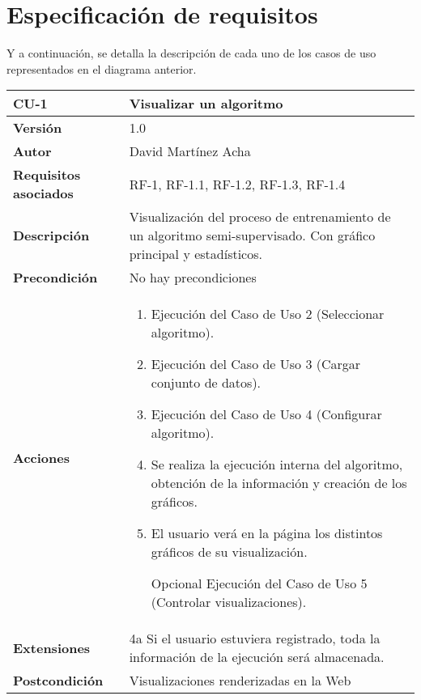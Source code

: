 \section{Especificación de requisitos}


Y a continuación, se detalla la descripción de cada uno de los casos de uso
representados en el diagrama anterior.

\begin{table}[p]
	\centering
	\begin{tabularx}{\linewidth}{ p{} p{} }
		\toprule
		\textbf{CU-1}    & \textbf{Visualizar un algoritmo}\\
		\toprule
		\textbf{Versión}              & 1.0    \\
		\textbf{Autor}                & David Martínez Acha \\
		\textbf{Requisitos asociados} & RF-1, RF-1.1, RF-1.2, RF-1.3, RF-1.4 \\
		\textbf{Descripción}          & Visualización del proceso de entrenamiento de un algoritmo semi-supervisado. Con gráfico principal y estadísticos. \\
		\textbf{Precondición}         & No hay precondiciones \\
		\textbf{Acciones}             &
		\begin{enumerate}
			\def\labelenumi{\arabic{enumi}.}
			\tightlist
			\item Ejecución del Caso de Uso 2 (Seleccionar algoritmo).
			\item Ejecución del Caso de Uso 3 (Cargar conjunto de datos).
            \item Ejecución del Caso de Uso 4 (Configurar algoritmo).
			\item Se realiza la ejecución interna del algoritmo, obtención de la información y creación de los gráficos.
            \item El usuario verá en la página los distintos gráficos de su visualización. 
            \item [Opcional] Ejecución del Caso de Uso 5 (Controlar visualizaciones).
		\end{enumerate}\\
		\textbf{Extensiones}          & 4a Si el usuario estuviera registrado, toda la información de la ejecución será almacenada. \\
		\textbf{Postcondición}        & Visualizaciones renderizadas en la Web \\

\end{tabularx}
\end{table}

